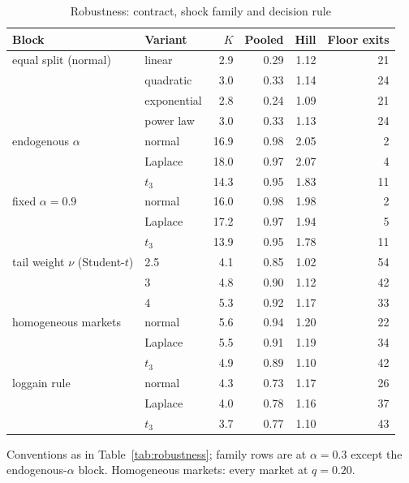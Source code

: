 \begin{table}[htbp]
\centering
\caption{Robustness: contract, shock family and decision rule}
\label{tab:robustness-b}
\small
\begin{tabular}{llrrrr}
\toprule
Block & Variant & $K$ & Pooled & Hill & Floor exits \\
\midrule
equal split (normal) & linear & 2.9 & 0.29 & 1.12 & 21 \\
 & quadratic & 3.0 & 0.33 & 1.14 & 24 \\
 & exponential & 2.8 & 0.24 & 1.09 & 21 \\
 & power law & 3.0 & 0.33 & 1.13 & 24 \\
\midrule
endogenous $\alpha$ & normal & 16.9 & 0.98 & 2.05 & 2 \\
 & Laplace & 18.0 & 0.97 & 2.07 & 4 \\
 & $t_3$ & 14.3 & 0.95 & 1.83 & 11 \\
\midrule
fixed $\alpha = 0.9$ & normal & 16.0 & 0.98 & 1.98 & 2 \\
 & Laplace & 17.2 & 0.97 & 1.94 & 5 \\
 & $t_3$ & 13.9 & 0.95 & 1.78 & 11 \\
\midrule
tail weight $\nu$ (Student-$t$) & 2.5 & 4.1 & 0.85 & 1.02 & 54 \\
 & 3 & 4.8 & 0.90 & 1.12 & 42 \\
 & 4 & 5.3 & 0.92 & 1.17 & 33 \\
\midrule
homogeneous markets & normal & 5.6 & 0.94 & 1.20 & 22 \\
 & Laplace & 5.5 & 0.91 & 1.19 & 34 \\
 & $t_3$ & 4.9 & 0.89 & 1.10 & 42 \\
\midrule
loggain rule & normal & 4.3 & 0.73 & 1.17 & 26 \\
 & Laplace & 4.0 & 0.78 & 1.16 & 37 \\
 & $t_3$ & 3.7 & 0.77 & 1.10 & 43 \\
\bottomrule
\end{tabular}
\par\smallskip\begin{minipage}{0.95\linewidth}\footnotesize Conventions as in Table~\ref{tab:robustness}; family rows are at $\alpha = 0.3$ except the endogenous-$\alpha$ block. Homogeneous markets: every market at $q = 0.20$.\end{minipage}
\end{table}

